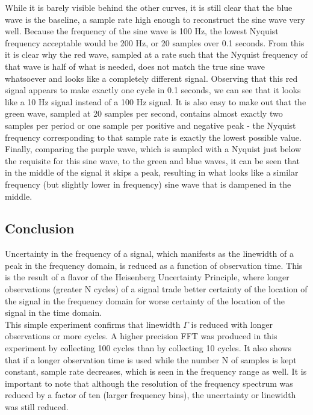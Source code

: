 \documentclass[aps,prl,reprint]{revtex4-2}
\begin{document}
While it is barely visible behind the other curves, it is still clear that
the blue wave is the baseline, a sample rate high enough to reconstruct
the sine wave very well. Because the frequency of the sine wave is 100 Hz,
the lowest Nyquist frequency acceptable would be 200 Hz, or 20 samples over
0.1 seconds. From this it is clear why the red wave, sampled at a rate
such that the Nyquist frequency of that wave is half of what is needed,
does not match the true sine wave whatsoever and looks like a completely
different signal. Observing that this red signal appears to make exactly one
cycle in 0.1 seconds, we can see that it looks like a 10 Hz signal instead of
a 100 Hz signal. It is also easy to make out that the green wave, sampled
at 20 samples per second, contains almost exactly two samples per period or 
one sample per positive and negative peak - the Nyquist frequency corresponding
to that sample rate is exactly the lowest possible value. Finally,
comparing the purple wave, which is sampled with a Nyquist just below the
requisite for this sine wave, to the green and blue waves, it can be seen that
in the middle of the signal it skips a peak, resulting in what looks like a
similar frequency (but slightly lower in frequency) sine wave that is
dampened in the middle. 


\subsection{Conclusion}

Uncertainty in the frequency of a signal, which manifests as the linewidth
of a peak in the frequency domain, is reduced as a function of observation time.
This is the result of a flavor of the Heisenberg Uncertainty Principle, where 
longer observations (greater N cycles) of a signal trade better certainty of 
the location of the signal in the frequency domain for worse certainty of the 
location of the signal in the time domain. \\

This simple experiment confirms that linewidth $\Gamma$ is reduced with
longer observations or more cycles. A higher precision FFT was produced
in this experiment by collecting 100 cycles than by collecting 10 cycles.
It also shows that if a longer observation time is used while the number
N of samples is kept constant, sample rate decreases, which is seen in the
frequency range as well. It is important to note that although the 
resolution of the frequency spectrum was reduced by a factor of ten (larger frequency
bins), the uncertainty or linewidth was still reduced. 
\end{document}
